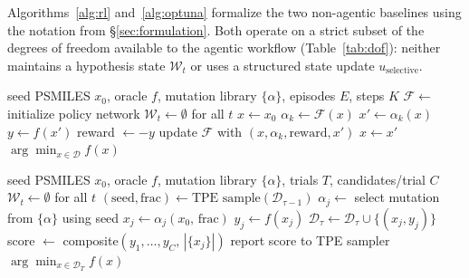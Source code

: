 \documentclass[twocolumn]{fairmeta}
\begin{document}
Algorithms~\ref{alg:rl} and~\ref{alg:optuna} formalize the two non-agentic baselines using the notation from \S\ref{sec:formulation}.
Both operate on a strict subset of the degrees of freedom available to the agentic workflow (Table~\ref{tab:dof}): neither maintains a hypothesis state $\mathcal{W}_t$ or uses a structured state update $u_\text{selective}$.

\begin{algorithm}[H]
\caption{RL Polymer Discovery (DQN / PPO)}\label{alg:rl}
\small
\begin{algorithmic}[1]
\Require seed PSMILES $x_0$, oracle $f$, mutation library $\{\alpha\}$, episodes $E$, steps $K$
\State $\mathcal{F} \gets$ initialize policy network 
\State $\mathcal{W}_t \gets \emptyset$ for all $t$ 
  \State $x \gets x_0$
    \State $\alpha_k \gets \mathcal{F}(x)$ 
    \State $x' \gets \alpha_k(x)$ 
    \State $y \gets f(x')$ 
    \State reward $\gets -y$
    \State update $\mathcal{F}$ with $(x, \alpha_k, \text{reward}, x')$
    \State $x \gets x'$
  \EndFor
\EndFor
\State \Return $\arg\min_{x \in \mathcal{D}} f(x)$
\end{algorithmic}
\end{algorithm}

\begin{algorithm}[H]
\caption{Optuna TPE Polymer Search}\label{alg:optuna}
\small
\begin{algorithmic}[1]
\Require seed PSMILES $x_0$, oracle $f$, mutation library $\{\alpha\}$, trials $T$, candidates/trial $C$
\State $\mathcal{W}_t \gets \emptyset$ for all $t$ 
  \State $(\text{seed}, \text{frac}) \gets \text{TPE sample}(\mathcal{D}_{\tau-1})$ 
    \State $\alpha_j \gets$ select mutation from $\{\alpha\}$ using seed
    \State $x_j \gets \alpha_j(x_0,\, \text{frac})$
    \State $y_j \gets f(x_j)$ 
    \State $\mathcal{D}_\tau \gets \mathcal{D}_\tau \cup \{(x_j, y_j)\}$
  \EndFor
  \State score $\gets$ composite$(y_1,\ldots,y_C,\, |\{x_j\}|)$
  \State report score to TPE sampler
\EndFor
\State \Return $\arg\min_{x \in \mathcal{D}_T} f(x)$
\end{algorithmic}
\end{algorithm}
\end{document}
